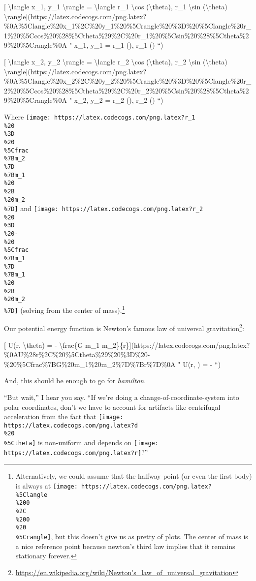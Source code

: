 \documentclass[]{article}
\renewcommand{\href}[2]{#2\footnote{\url{#1}}}
\begin{document}
{[} \textbackslash{}langle x\_1, y\_1 \textbackslash{}rangle =
\textbackslash{}langle r\_1 \textbackslash{}cos (\textbackslash{}theta), r\_1
\textbackslash{}sin (\textbackslash{}theta)
\textbackslash{}rangle{]}(https://latex.codecogs.com/png.latex?\%0A\%5Clangle\%20x\_1\%2C\%20y\_1\%20\%5Crangle\%20\%3D\%20\%5Clangle\%20r\_1\%20\%5Ccos\%20\%28\%5Ctheta\%29\%2C\%20r\_1\%20\%5Csin\%20\%28\%5Ctheta\%29\%20\%5Crangle\%0A
" \langle x\_1, y\_1 \rangle = \langle r\_1 \cos (\theta), r\_1 \sin (\theta)
\rangle
``)

{[} \textbackslash{}langle x\_2, y\_2 \textbackslash{}rangle =
\textbackslash{}langle r\_2 \textbackslash{}cos (\textbackslash{}theta), r\_2
\textbackslash{}sin (\textbackslash{}theta)
\textbackslash{}rangle{]}(https://latex.codecogs.com/png.latex?\%0A\%5Clangle\%20x\_2\%2C\%20y\_2\%20\%5Crangle\%20\%3D\%20\%5Clangle\%20r\_2\%20\%5Ccos\%20\%28\%5Ctheta\%29\%2C\%20r\_2\%20\%5Csin\%20\%28\%5Ctheta\%29\%20\%5Crangle\%0A
" \langle x\_2, y\_2 \rangle = \langle r\_2 \cos (\theta), r\_2 \sin (\theta)
\rangle
``)

Where
\texttt{[image: https://latex.codecogs.com/png.latex?r\_1\\\%20\\\%3D\\\%20\\\%5Cfrac\\\%7Bm\_2\\\%7D\\\%7Bm\_1\\\%20\\\%2B\\\%20m\_2\\\%7D]}
and
\texttt{[image: https://latex.codecogs.com/png.latex?r\_2\\\%20\\\%3D\\\%20-\\\%20\\\%5Cfrac\\\%7Bm\_1\\\%7D\\\%7Bm\_1\\\%20\\\%2B\\\%20m\_2\\\%7D]}
(solving from the center of mass).\footnote{Alternatively, we could assume that
  the halfway point (or even the first body) is always at
  \texttt{[image: https://latex.codecogs.com/png.latex?\\\%5Clangle\\\%200\\\%2C\\\%200\\\%20\\\%5Crangle]},
  but this doesn't give us as pretty of plots. The center of mass is a nice
  reference point because newton's third law implies that it remains stationary
  forever.}

Our potential energy function is Newton's famous
\href{https://en.wikipedia.org/wiki/Newton's_law_of_universal_gravitation}{law
of universal gravitation}:

{[} U(r, \textbackslash{}theta) = - \textbackslash{}frac\{G m\_1
m\_2\}\{r\}{]}(https://latex.codecogs.com/png.latex?\%0AU\%28r\%2C\%20\%5Ctheta\%29\%20\%3D\%20-\%20\%5Cfrac\%7BG\%20m\_1\%20m\_2\%7D\%7Br\%7D\%0A
" U(r, \theta) = -  ``)

And, this should be enough to go for \emph{hamilton}.

``But wait,'' I hear you say. ``If we're doing a change-of-coordinate-system
into polar coordinates, don't we have to account for artifacts like centrifugal
acceleration from the fact that
\texttt{[image: https://latex.codecogs.com/png.latex?d\\\%20\\\%5Ctheta]} is
non-uniform and depends on
\texttt{[image: https://latex.codecogs.com/png.latex?r]}?''
\end{document}
